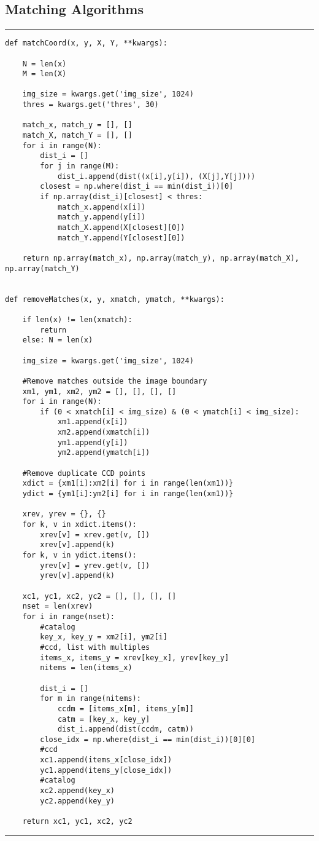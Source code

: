 \documentclass[preprint]{aastex62}
\begin{document}
\subsection{Matching Algorithms} \label{code:matching}
\hrule
\begin{lstlisting}
def matchCoord(x, y, X, Y, **kwargs):

    N = len(x)
    M = len(X)
    
    img_size = kwargs.get('img_size', 1024)
    thres = kwargs.get('thres', 30)
    
    match_x, match_y = [], []
    match_X, match_Y = [], []
    for i in range(N):
        dist_i = []
        for j in range(M):
            dist_i.append(dist((x[i],y[i]), (X[j],Y[j])))
        closest = np.where(dist_i == min(dist_i))[0]
        if np.array(dist_i)[closest] < thres:
            match_x.append(x[i])
            match_y.append(y[i])
            match_X.append(X[closest][0])
            match_Y.append(Y[closest][0])
        
    return np.array(match_x), np.array(match_y), np.array(match_X), np.array(match_Y)


def removeMatches(x, y, xmatch, ymatch, **kwargs):
    
    if len(x) != len(xmatch):
        return
    else: N = len(x)
    
    img_size = kwargs.get('img_size', 1024)
    
    #Remove matches outside the image boundary
    xm1, ym1, xm2, ym2 = [], [], [], []
    for i in range(N):
        if (0 < xmatch[i] < img_size) & (0 < ymatch[i] < img_size):
            xm1.append(x[i])
            xm2.append(xmatch[i])
            ym1.append(y[i])
            ym2.append(ymatch[i])

    #Remove duplicate CCD points       
    xdict = {xm1[i]:xm2[i] for i in range(len(xm1))}
    ydict = {ym1[i]:ym2[i] for i in range(len(xm1))}
    
    xrev, yrev = {}, {}
    for k, v in xdict.items():
        xrev[v] = xrev.get(v, [])
        xrev[v].append(k)
    for k, v in ydict.items():
        yrev[v] = yrev.get(v, [])
        yrev[v].append(k)

    xc1, yc1, xc2, yc2 = [], [], [], []
    nset = len(xrev)
    for i in range(nset):
        #catalog
        key_x, key_y = xm2[i], ym2[i] 
        #ccd, list with multiples
        items_x, items_y = xrev[key_x], yrev[key_y] 
        nitems = len(items_x)
        
        dist_i = []
        for m in range(nitems):
            ccdm = [items_x[m], items_y[m]]
            catm = [key_x, key_y]
            dist_i.append(dist(ccdm, catm))
        close_idx = np.where(dist_i == min(dist_i))[0][0]
        #ccd 
        xc1.append(items_x[close_idx])
        yc1.append(items_y[close_idx])
        #catalog
        xc2.append(key_x)
        yc2.append(key_y)
            
    return xc1, yc1, xc2, yc2
\end{lstlisting}
\hrule \vspace{7pt}
\end{document}
